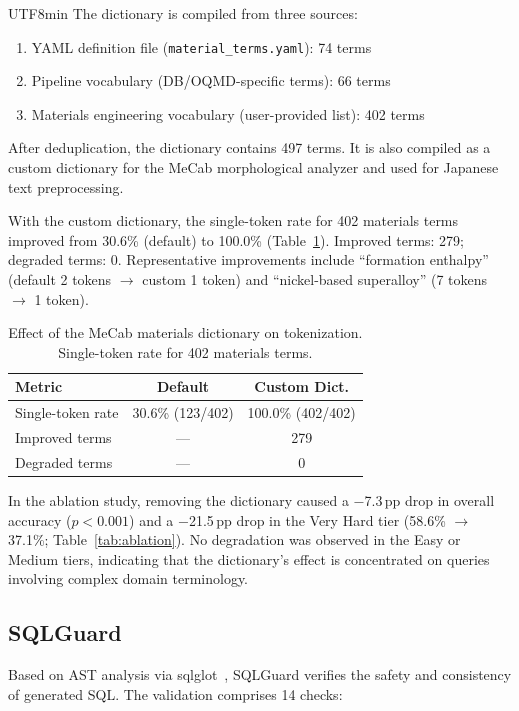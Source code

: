 \documentclass[sn-mathphys,Numbered]{sn-jnl}
\begin{document}
\begin{CJK}{UTF8}{min}
The dictionary is compiled from three sources:
\begin{enumerate}
  \item YAML definition file (\texttt{material\_terms.yaml}): 74 terms
  \item Pipeline vocabulary (DB/OQMD-specific terms): 66 terms
  \item Materials engineering vocabulary (user-provided list): 402 terms
\end{enumerate}
After deduplication, the dictionary contains 497 terms.
It is also compiled as a custom dictionary for the MeCab morphological
analyzer and used for Japanese text preprocessing.

With the custom dictionary, the single-token rate for 402 materials
terms improved from 30.6\% (default) to 100.0\%
(Table~\ref{tab:mecab}).
Improved terms: 279; degraded terms: 0.
Representative improvements include ``formation enthalpy''
(default 2 tokens $\to$ custom 1 token) and
``nickel-based superalloy'' (7 tokens $\to$ 1 token).

\begin{table}[t]
\centering
\caption{Effect of the MeCab materials dictionary on tokenization.
Single-token rate for 402 materials terms.}
\label{tab:mecab}
\small
\begin{tabular}{@{}lcc@{}}
\toprule
Metric & Default & Custom Dict. \\
\midrule
Single-token rate & 30.6\% (123/402) & 100.0\% (402/402) \\
Improved terms & --- & 279 \\
Degraded terms & --- & 0 \\
\bottomrule
\end{tabular}
\end{table}

In the ablation study, removing the dictionary caused a $-$7.3\,pp
drop in overall accuracy ($p<0.001$) and a $-$21.5\,pp drop in the
Very Hard tier (58.6\% $\to$ 37.1\%; Table~\ref{tab:ablation}).
No degradation was observed in the Easy or Medium tiers, indicating
that the dictionary's effect is concentrated on queries involving
complex domain terminology.

\subsection{SQLGuard}
\label{sec:sqlguard}

Based on AST analysis via sqlglot~\cite{sqlglot2023},
SQLGuard verifies the safety and consistency of generated SQL.
The validation comprises 14 checks:


\end{CJK}
\end{document}
